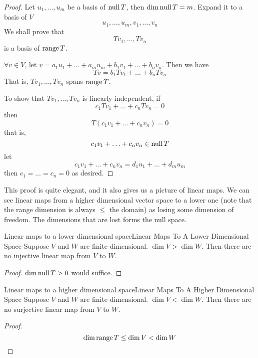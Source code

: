 \documentclass[../main.tex]{subfiles}
\begin{document}
\begin{proof}
Let $u_1, \ldots ,u_m$ be a basis of $\operatorname{null} T$, then $\dim \operatorname{null} T=m$. Expand it to a basis of $V$ 
\begin{equation*}
u_1, \ldots ,u_m, v_1, \ldots ,v_n
\end{equation*}
We shall prove that
\begin{equation*}
Tv_1, \ldots ,Tv_n
\end{equation*}
is a basis of $\operatorname{range} T$.

$\forall v\in V$, let $v= a_1u_1+\ldots +a_mu_m + b_1v_1+\ldots +b_nv_n$. Then we have
\begin{equation*}
Tv= b_1Tv_1+\ldots +b_nTv_n
\end{equation*}
That is, $Tv_1, \ldots ,Tv_n$ spans $\operatorname{range} T$.

To show that $Tv_1, \ldots ,Tv_n$ is linearly independent, if
\begin{equation*}
c_1Tv_1+\ldots +c_nTv_n=0
\end{equation*}
then
\begin{equation*}
T(c_1v_1+\ldots +c_nv_n)=0
\end{equation*}
that is,
\begin{equation*}
c_1v_1+\ldots +c_nv_n\in \operatorname{null} T
\end{equation*}
let
\begin{equation*}
c_1v_1+\ldots +c_nv_n = d_1u_1+\ldots +d_mu_m
\end{equation*}
then $c_1=\ldots =c_n=0$ as desired.
\end{proof}

\begin{remark}
This proof is quite elegant, and it also gives us a picture of linear maps. We can see linear maps from a higher dimensional vector space to a lower one (note that the range dimension is always $\leq $ the domain) as losing some dimension of freedom. The dimensions that are lost forms the null space.
\end{remark}

\begin{theorem}{Linear maps to a lower dimensional space}{Linear Maps To A Lower Dimensional Space}
Suppose $V$ and $W$ are finite-dimensional. $\dim V > \dim W$. Then there are no injective linear map from $V$ to $W$.
\end{theorem}
\begin{proof}
$\dim \operatorname{null} T >0$ would suffice.
\end{proof}
\begin{theorem}{Linear maps to a higher dimensional space}{Linear Maps To A Higher Dimensional Space}
Suppose $V$ and $W$ are finite-dimensional. $\dim V < \dim W$. Then there are no surjective linear map from $V$ to $W$.
\end{theorem}
\begin{proof}
\begin{equation*}
\dim \operatorname{range} T \leq \dim V < \dim W
\end{equation*}
\end{proof}
\end{document}
